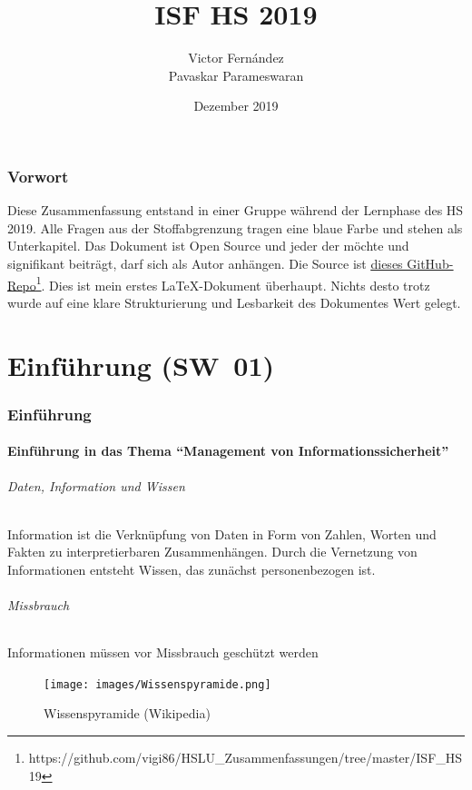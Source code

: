 \documentclass[10pt,a4paper]{article}
\title{ISF HS 2019}
\author{Victor Fernández\\Pavaskar Parameswaran}
\date{Dezember 2019}
\begin{document}
\maketitle
\thispagestyle{empty}
\section*{Vorwort}Diese Zusammenfassung entstand in einer Gruppe während der Lernphase des HS 2019. Alle Fragen aus der Stoffabgrenzung tragen eine {\color{dunkelblau}blaue Farbe} und stehen als Unterkapitel. Das Dokument ist Open Source und jeder der möchte und signifikant beiträgt, darf sich als Autor anhängen. Die Source ist \underline{\href{https://github.com/vigi86/HSLU_Zusammenfassungen/tree/master/ISF_HS19}{dieses GitHub-Repo}}\footnote{https://github.com/vigi86/HSLU\_Zusammenfassungen/tree/master/ISF\_HS19}. Dies ist mein erstes \LaTeX{}-Dokument überhaupt. Nichts desto trotz wurde auf eine klare Strukturierung und Lesbarkeit des Dokumentes Wert gelegt.
\tableofcontents
\thispagestyle{empty}
\pagebreak


\part{Einführung (SW~01)}
\section{Einführung}
\subsection*{Einführung in das Thema "`Management von Informationssicherheit"'}
\paragraph*{Daten, Information und Wissen}
Information ist die Verknüpfung von Daten in Form von Zahlen, Worten und Fakten zu interpretierbaren Zusammenhängen.
Durch die Vernetzung von Informationen entsteht Wissen, das zunächst personenbezogen ist.

\paragraph*{Missbrauch}Informationen müssen vor Missbrauch geschützt werden
\begin{figure}[H]
    \begin{center}
    \texttt{[image: images/Wissenspyramide.png]}
    \caption{Wissenspyramide (Wikipedia)}
    \label{Wissenspyramide}
    \end{center}
\end{figure}
\end{document}
